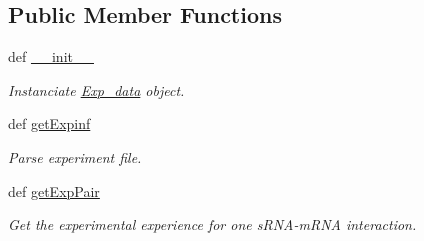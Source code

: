 \subsection*{\-Public \-Member \-Functions}
\begin{DoxyCompactItemize}
\item 
\hypertarget{classiRNA__stat_1_1Exp__data_1_1Exp__data_a57499f8e7fb154163a423c62412333cb}{
def \hyperlink{classiRNA__stat_1_1Exp__data_1_1Exp__data_a57499f8e7fb154163a423c62412333cb}{\-\_\-\-\_\-init\-\_\-\-\_\-}}
\label{classiRNA__stat_1_1Exp__data_1_1Exp__data_a57499f8e7fb154163a423c62412333cb}

\begin{DoxyCompactList}\small\item\em \-Instanciate \hyperlink{classiRNA__stat_1_1Exp__data_1_1Exp__data}{\-Exp\-\_\-data} object. \end{DoxyCompactList}\item 
def \hyperlink{classiRNA__stat_1_1Exp__data_1_1Exp__data_af46acae1fc1e3aeebb30f7b44afe3853}{get\-Expinf}
\begin{DoxyCompactList}\small\item\em \-Parse experiment file. \end{DoxyCompactList}\item 
def \hyperlink{classiRNA__stat_1_1Exp__data_1_1Exp__data_a3199f1165285f745375f92839ff8ea62}{get\-Exp\-Pair}
\begin{DoxyCompactList}\small\item\em \-Get the experimental experience for one s\-R\-N\-A-\/m\-R\-N\-A interaction. \end{DoxyCompactList}\end{DoxyCompactItemize}
